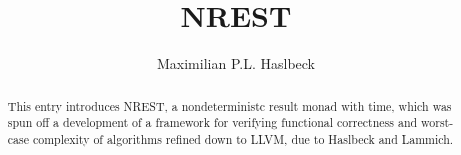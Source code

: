 \documentclass[11pt,a4paper]{article}
\begin{document}
\title{NREST}
\author{Maximilian P.L. Haslbeck}
\maketitle

\begin{abstract}
  This entry introduces NREST, a nondeterministc result monad with time,
  which was spun off a development of a framework for verifying 
  functional correctness and worst-case complexity of algorithms refined
  down to LLVM, due to Haslbeck and Lammich. 
\end{abstract}

\tableofcontents



\nocite{*}


\end{document}
